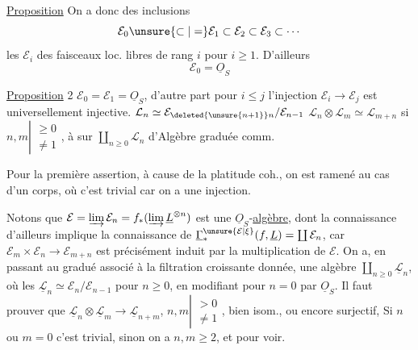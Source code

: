 \uline{Proposition} On a donc des  inclusions
\[
\mathcal E_0\unsure{\subset|=}\mathcal E_1\subset\mathcal E_2\subset\mathcal E_3\subset\cdots
\]
les $\mathcal E_i$  des faisceaux loc. libres de rang $i$ pour $i\geq1$. D'ailleurs
\[
\mathcal E_0=\underline O_S
\]

\uline{Proposition} 2 $\mathcal E_0=\mathcal E_1=\underline O_S$, d'autre part pour $i\leq j$ l'injection $\mathcal E_i\longrightarrow\mathcal E_j$ est  universellement injective.   $\mathcal L_n\simeq\mathcal E_{\deleted{\unsure{n+1}}n}/\mathcal E_{n-1}$   $\mathcal L_n\otimes\mathcal L_m\simeq\mathcal L_{m+n}$ si $n,m\left|\begin{smallmatrix}\geq0\\\ne1\end{smallmatrix}\right.$,   à  sur $\coprod_{n\geq0}\mathcal L_n$  d'Algèbre graduée comm.

Pour la première assertion, à cause de la platitude coh., on est ramené au cas d'un corps, où c'est trivial car on a une injection.

Notons que $\mathcal E=\varinjlim\mathcal E_n=f_*(\varinjlim\underline L^{\otimes n})$ est une $\underline O_S$-\uline{algèbre}, dont la connaissance d'ailleurs implique la connaissance de $\underline\Gamma_*^{\unsure{\mathcal E|\xi}}(f,\underline L)=\coprod\mathcal E_n$, car $\mathcal E_m\times\mathcal E_n\longrightarrow\mathcal E_{m+n}$ est précisément induit par la multiplication de $\mathcal E$. On a, en passant au gradué associé à la filtration croissante donnée, une algèbre $\coprod_{n\geq0}\underline{\mathcal L}_n$, où les $\underline{\mathcal L}_n\simeq\mathcal E_n/\mathcal E_{n-1}$ pour $n\geq0$, en modifiant pour $n=0$ par $\underline O_S$. Il faut prouver que $\underline{\mathcal L}_n\otimes\underline{\mathcal L}_m\longrightarrow\underline{\mathcal L}_{n+m}$, $n,m\left|\begin{smallmatrix}>0\\\ne1\end{smallmatrix}\right.$,   bien isom., ou encore surjectif,  Si $n$ ou $m=0$  c'est trivial, sinon on a $n,m\geq2$, et pour voir.
